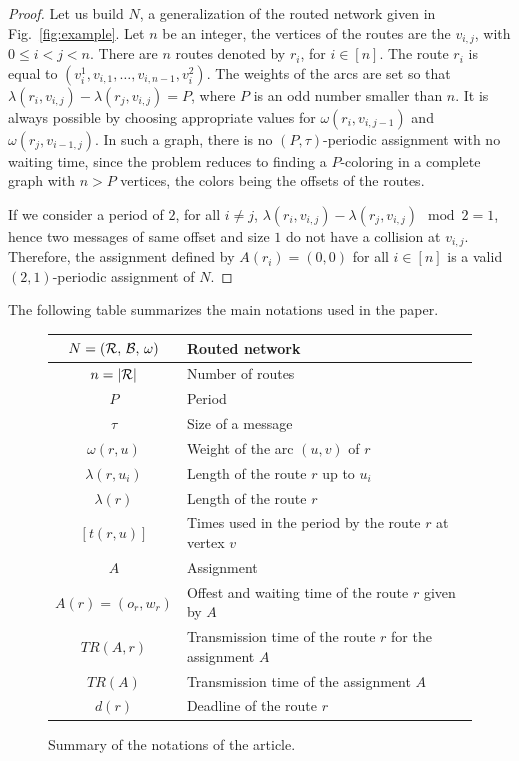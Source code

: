 \documentclass[a4paper,10pt]{article}
\begin{document}
	\begin{proof}
      Let us build $N$, a generalization of the routed network given in Fig.~\ref{fig:example}. 
      Let $n$ be an integer, the vertices of the routes are the $v_{i,j}$, with $0 \leq i < j <n$. 
      There are $n$ routes denoted by $r_i$, for $i \in [n]$. The route $r_i$ is equal to $(v_i^1,v_{i,1},\dots,v_{i,n-1},v_i^2)$. The weights of the arcs are set so that $\lambda(r_i, v_{i,j}) - \lambda(r_j,v_{i,j})= P$, where $P$ is an odd number smaller than $n$. It is always possible by choosing appropriate values for $\omega(r_i,v_{i,j-1})$ and $\omega(r_j,v_{i-1,j})$. In such a graph, there is no $(P,\tau)$-periodic assignment with no waiting time, since the problem reduces to finding a $P$-coloring in a complete graph with $n > P$ vertices, the colors being the offsets of the routes.

      If we consider a period of $2$, for all $i \neq j$, $\lambda(r_i, v_{i,j}) - \lambda(r_j, v_{i,j}) \mod 2 = 1$, hence two messages of same offset and size $1$ do not have a collision at $v_{i,j}$. Therefore, the assignment defined by $A(r_i) = (0,0)$ for all $i \in [n]$ is a valid $(2,1)$-periodic assignment of $N$.      
\end{proof}


      The following table summarizes the main notations used in the paper.
      \begin{figure}
      \begin{center}
   \begin{tabularx}{\textwidth}{|c|X|}
    \hline
     $N = (\cal{R},\,\cal{B},\,\omega)$ & Routed network \\
     \hline
     $n = |\cal{R}|$ & Number of routes\\
     \hline
     $P$ & Period\\
     \hline
     $\tau$ & Size of a message\\
     \hline
     $\omega(r,u)$ & Weight of the arc $(u,v)$ of $r$ \\
     \hline
     $\lambda(r,u_i)$ & Length of the route $r$ up to $u_i$\\
     \hline
     $\lambda(r)$ & Length of the route $r$\\
     \hline
     $ [t(r,u)]$& Times used in the period by the route $r$ at vertex $v$\\
     \hline 
     $A$ & Assignment\\
     \hline 
     $A(r) = (o_r,w_r)$ & Offest and waiting time of the route $r$ given by $A$ \\
     \hline 
     $TR(A,r)$& Transmission time of the route $r$ for the assignment $A$\\
     \hline 
     $TR(A)$& Transmission time of the assignment $A$\\
     \hline
     $d(r)$ & Deadline of the route $r$\\
     \hline

      \end{tabularx}
      \end{center}
      \caption{Summary of the notations of the article.}
      \end{figure}
  	
\end{document}
